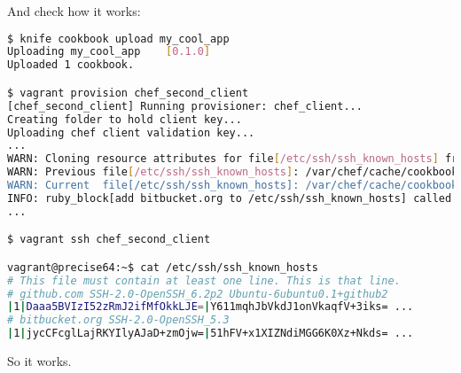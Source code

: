 And check how it works:

\begin{lstlisting}[language=Bash,label=lst:cookbook-hwrp10]
$ knife cookbook upload my_cool_app
Uploading my_cool_app    [0.1.0]
Uploaded 1 cookbook.

$ vagrant provision chef_second_client
[chef_second_client] Running provisioner: chef_client...
Creating folder to hold client key...
Uploading chef client validation key...
...
WARN: Cloning resource attributes for file[/etc/ssh/ssh_known_hosts] from prior resource (CHEF-3694)
WARN: Previous file[/etc/ssh/ssh_known_hosts]: /var/chef/cache/cookbooks/my_cool_app/providers/know_host.rb:39:in `insure_for_file'
WARN: Current  file[/etc/ssh/ssh_known_hosts]: /var/chef/cache/cookbooks/my_cool_app/libraries/provider_known_host.rb:62:in `insure_for_file'
INFO: ruby_block[add bitbucket.org to /etc/ssh/ssh_known_hosts] called
...

$ vagrant ssh chef_second_client

vagrant@precise64:~$ cat /etc/ssh/ssh_known_hosts
# This file must contain at least one line. This is that line.
# github.com SSH-2.0-OpenSSH_6.2p2 Ubuntu-6ubuntu0.1+github2
|1|Daaa5BVIzI52zRmJ2ifMfOkkLJE=|Y611mqhJbVkdJ1onVkaqfV+3iks= ...
# bitbucket.org SSH-2.0-OpenSSH_5.3
|1|jycCFcglLajRKYIlyAJaD+zmOjw=|51hFV+x1XIZNdiMGG6K0Xz+Nkds= ...
\end{lstlisting}

So it works.